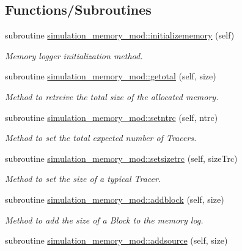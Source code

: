 \subsection*{Functions/\+Subroutines}
\begin{DoxyCompactItemize}
\item 
subroutine \mbox{\hyperlink{namespacesimulation__memory__mod_ac8306165e4ec88fec9a2b8b719f61893}{simulation\+\_\+memory\+\_\+mod\+::initializememory}} (self)
\begin{DoxyCompactList}\small\item\em Memory logger initialization method. \end{DoxyCompactList}\item 
subroutine \mbox{\hyperlink{namespacesimulation__memory__mod_acf04d6b930ed3ffbc0950afd86033c51}{simulation\+\_\+memory\+\_\+mod\+::getotal}} (self, size)
\begin{DoxyCompactList}\small\item\em Method to retreive the total size of the allocated memory. \end{DoxyCompactList}\item 
subroutine \mbox{\hyperlink{namespacesimulation__memory__mod_ab16ab3a2c4acf078dd1a9e75778f64df}{simulation\+\_\+memory\+\_\+mod\+::setntrc}} (self, ntrc)
\begin{DoxyCompactList}\small\item\em Method to set the total expected number of Tracers. \end{DoxyCompactList}\item 
subroutine \mbox{\hyperlink{namespacesimulation__memory__mod_acc218928b4d5fc707cbe3bc4befafa65}{simulation\+\_\+memory\+\_\+mod\+::setsizetrc}} (self, size\+Trc)
\begin{DoxyCompactList}\small\item\em Method to set the size of a typical Tracer. \end{DoxyCompactList}\item 
subroutine \mbox{\hyperlink{namespacesimulation__memory__mod_a4169689db37b3ba35e092096a7019f80}{simulation\+\_\+memory\+\_\+mod\+::addblock}} (self, size)
\begin{DoxyCompactList}\small\item\em Method to add the size of a Block to the memory log. \end{DoxyCompactList}\item 
subroutine \mbox{\hyperlink{namespacesimulation__memory__mod_a940ff42fa3a49423f9ac98da2bffa54c}{simulation\+\_\+memory\+\_\+mod\+::addsource}} (self, size)

\end{DoxyCompactItemize}
